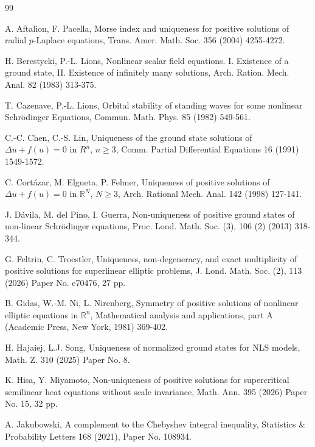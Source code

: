 \documentclass{article}
\theoremstyle{definition} \theoremstyle{remark}
\numberwithin{equation}{section}
\newcommand{\R}{\mathbb{R}}
\begin{document}
\begin{thebibliography}{99}


 A. Aftalion,  F. Pacella, Morse index and uniqueness for positive solutions of radial $p$-Laplace equations, Trans. Amer. Math. Soc. 356 (2004) 4255-4272.

 H. Berestycki, P.-L. Lions, Nonlinear scalar field equations. I. Existence of a ground state, II. Existence of infinitely many solutions, Arch. Ration. Mech. Anal. 82 (1983) 313-375.

 T. Cazenave, P.-L. Lions, Orbital stability of standing waves for some nonlinear Schr\"odinger Equations, Commun. Math. Phys. 85 (1982) 549-561.

 C.-C. Chen, C.-S. Lin, Uniqueness of the ground state solutions of $\Delta u + f(u) = 0$ in $R^n$, $n \ge 3$, Comm. Partial Differential Equations 16 (1991) 1549-1572.


 C. Cort\'azar,  M. Elgueta,  P. Felmer,  Uniqueness of positive solutions of $\Delta u+f(u)=0$ in $\R^N$, $N\geq 3$, Arch. Rational Mech. Anal. 142 (1998) 127-141.




 J. D\'avila, M. del Pino, I. Guerra, Non-uniqueness of positive ground states of non-linear Schr\"odinger equations, Proc. Lond. Math. Soc. (3), 106 (2) (2013) 318-344.




 G. Feltrin, C.  Troestler,   Uniqueness, non-degeneracy, and exact multiplicity of positive solutions for superlinear elliptic problems, J. Lond. Math. Soc. (2), 113 (2026) Paper No. e70476, 27 pp.

  
  
  
 B. Gidas, W.-M. Ni, L. Nirenberg, Symmetry of positive solutions of nonlinear elliptic equations in $\R^n$, Mathematical analysis and applications, part A (Academic Press, New York, 1981) 369-402.


 H. Hajaiej, L.J. Song, Uniqueness of normalized ground states for NLS models, Math. Z. 310 (2025) Paper No. 8.



   K. Hisa,  Y.  Miyamoto, Non-uniqueness of positive solutions for supercritical semilinear heat equations without scale invariance, Math. Ann. 395 (2026) Paper No. 15, 32 pp.

   
   
   
 A. Jakubowski, A complement to the Chebyshev integral inequality, Statistics \& Probability Letters 168 (2021), Paper No. 108934.



\end{thebibliography}
\end{document}
